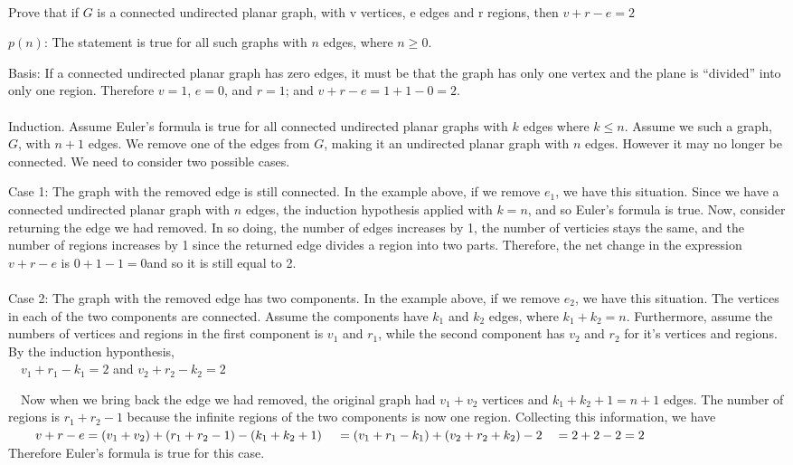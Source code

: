 \documentclass{article}
\begin{document}
\begin{doublespace}
\noindent\(\pmb{}\)
\end{doublespace}

Prove that if \(G\) is a connected undirected planar graph, with v vertices, e edges and r regions, then \(v+r-e=2\)

\(p(n)\): { }The statement is true for all such graphs with \(n\) edges, where \(n\geq 0\).

Basis: { }If a connected undirected planar graph has zero edges, it must be that the graph has only one vertex and the plane is {``}divided{''} into
only one region. { }Therefore \(v=1\), \(e=0\), and \(r=1\); and { } \(v+r-e=1+1-0 =2\).\\
\\
Induction. { }Assume Euler{'}s formula is true for all connected undirected planar graphs { }with \(k\) edges where \(k\leq n\). { } Assume we such
a graph, \(G\), with \(n+1\) edges. { }We remove one of the edges from \(G\), making it an undirected planar graph with \(n\) edges. { }However it
may no longer be connected. { }We need to consider two possible cases.

Case 1: { }The graph with the removed edge is still connected. In the example above, if we remove \(e_1\), we have this situation. { }Since we have
a connected undirected planar graph with \(n\) edges, the induction hypothesis applied with \(k=n\), and so Euler{'}s formula is true. { }Now, consider
returning the edge we had removed. { }In so doing, the number of edges increases by 1, the number of verticies stays the same, and the number of
regions increases by 1 since the returned edge divides a region into two parts. { }Therefore, the net change in the expression \(v+r-e\) is \(0+1-1=0\)and
so it is still equal to 2.\\
\\
Case 2: The graph with the removed edge has two components. In the example above, if we remove \(e_2\), we have this situation. { } The vertices
in each of the two components are connected. { }Assume the components have \(k_1\) and \(k_2\) edges, where \(k_1+k_2= n\). { }Furthermore, assume
the numbers of vertices and regions in the first component is \(v_1\) and \(r_1\), while the second component has \(v_2\) and \(r_2\) for it{'}s
vertices and regions. By the induction hyponthesis, \\
$\quad $\(v_1+r_1-k_1=2\) { } and { } \(v_2+r_2-k_2=2\)

$\quad $Now when we bring back the edge we had removed, the original graph had \(v_1+ v_2\) vertices and \(k_1+k_2+1= n+1\) edges. { }The number
of regions is \(r_1+ r_2-1\) because the infinite regions of the two components { }is now one region. { }Collecting this information, we have \\
$\quad \quad $\(v+r-e = \left(v_1+v_2\right)+\left(r_1+ r_2-1\right) -\left(k_1+k_2+1\right)\\
\\
\quad = \left(v_1+r_1-k_1\right)+ \left(v_2+r_2+k_2\right) -2\\
\\
\quad =2+2-2 = 2\)\\
Therefore Euler{'}s formula is true for this case.
\end{document}
